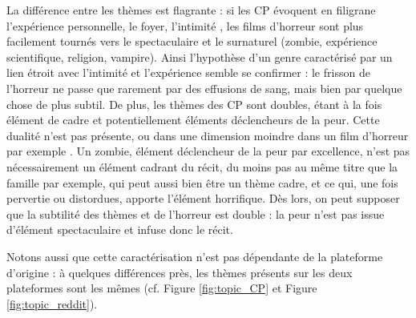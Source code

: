\documentclass[12pt,a4paper,oneside,titlepage]{book} %
\begin{document}
	La différence entre les thèmes est flagrante : si les CP évoquent en filigrane l'expérience personnelle, le foyer, l'intimité , les films d'horreur sont plus facilement tournés vers le spectaculaire et le surnaturel (zombie, expérience scientifique, religion, vampire). 
	Ainsi l'hypothèse d'un genre caractérisé par un lien étroit avec l'intimité et l'expérience semble se confirmer : le frisson de l'horreur ne passe que rarement par des effusions de sang, mais bien par quelque chose de plus subtil.
	De plus, les thèmes des CP sont doubles, étant à la fois élément de cadre et potentiellement éléments déclencheurs de la peur. Cette dualité n'est pas présente, ou dans une dimension moindre dans un film d'horreur par exemple . Un zombie, élément déclencheur de la peur par excellence, n'est pas nécessairement un élément cadrant du récit, du moins pas au même titre que la famille par exemple, qui peut aussi bien être un thème cadre, et ce qui, une fois pervertie ou distordues, apporte l'élément horrifique. Dès lors, on peut supposer que la subtilité des thèmes et de l'horreur est double : la peur n'est pas issue d'élément spectaculaire et infuse donc le récit.
	
	Notons aussi que cette caractérisation n'est pas dépendante de la plateforme d'origine : à quelques différences près, les thèmes présents sur les deux plateformes sont les mêmes (cf. Figure \ref{fig:topic_CP} et Figure \ref{fig:topic_reddit}). 
	
		
		
\end{document}
